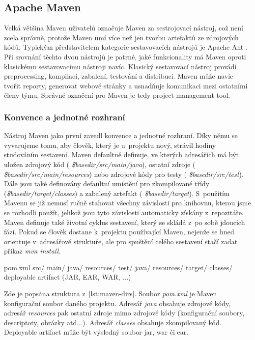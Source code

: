 \documentclass[11pt,twoside,a4paper]{book}
\begin{document}
\subsection{Apache Maven}

Velká většina Maven \cite{Maven08} uživatelů označuje Maven za sestrojovací nástroj,
což není zcela správně, protože Maven umí více než jen tvorbu artefaktů ze zdrojových kódů. Typickým představitelem
kategorie sestavovacích nástrojů je Apache Ant \cite{AntHome}. Při srovnání těchto dvou
nástrojů je patrné, jaké funkcionality má Maven oproti klasickému sestavovacímu
nástroji navíc. Klasický sestavovací nástroj provádí preprocessing, kompilaci, zabalení, testování a distribuci. Maven může navíc tvořit reporty,
generovat webové stránky a usnadňuje komunikaci mezi ostatními členy týmu. Správné
označení pro Maven je tedy project management tool.

\subsubsection{Konvence a jednotné rozhraní}

Nástroj Maven jako první zavedl konvence a jednotné rozhraní. Díky němu se
vyvarujeme tomu, aby člověk, který je u~projektu nový, strávil hodiny studováním
sestavení.
Maven defaultně definuje, ve kterých adresářích má být uložen zdrojový kód ({\em
\${basedir}/src/main/java}), ostatní zdroje ({\em
\${basedir}/src/main/resources}) nebo zdrojové kódy pro testy ({\em
\${basedir}/src/test}). Dále jsou také definovány defaultní umístění pro
zkompilované třídy ({\em \${basedir}/target/classes}) a zabalený artefakt ({\em
\${basedir}/target}). S~použitím Mavenu se již nemusí ručně stahovat všechny
závislosti pro knihovnu, kterou jsme se rozhodli použít, jelikož jsou tyto
závislosti automaticky získány z~repozitáře. Maven definuje také životní cyklus
sestavení, který se skládá z~po sobě jdoucích fází.
Pokud se člověk dostane k~projektu používající Maven, nejenže se hned orientuje
v~adresářové struktuře, ale pro spuštění celého sestavení stačí zadat příkaz
{\em mvn install}.

\begin{code}[frame=single, caption={Defaultní adresářová struktura Maven
projektu}, label={lst:maven-dirs}] pom.xml
src/
  main/
    java/
    resources/
  test/
    java/
    resources/
target/
  classes/
  deployable artifact (JAR, EAR, WAR, ...)
\end{code}

Zde je popsána struktura z~\ref{lst:maven-dirs}. Soubor {\em pom.xml} je Maven
konfigurační soubor daného projektu.
Adresář {\em java} obsahuje zdrojové kódy, adresář {\em resources} pak ostatní zdroje mimo
zdrojové kódy (konfigurační soubory, descriptoty, obrázky atd...). Adresář {\em
classes} obsahuje zkompilovaný kód. Deployable artifact může být výsledný soubor
jar, war či ear.
\end{document}
